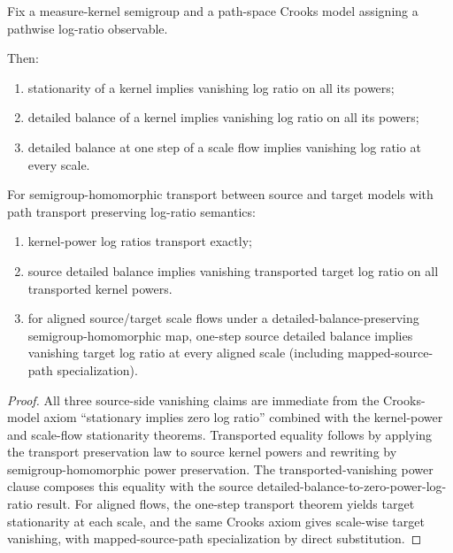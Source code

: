 \begin{theorem}\label{thm:path-space-crooks-kernel-power-transport}
Fix a measure-kernel semigroup and a path-space Crooks model assigning a pathwise log-ratio observable.

Then:
\begin{enumerate}
\item stationarity of a kernel implies vanishing log ratio on all its powers;
\item detailed balance of a kernel implies vanishing log ratio on all its powers;
\item detailed balance at one step of a scale flow implies vanishing log ratio at every scale.
\end{enumerate}

For semigroup-homomorphic transport between source and target models with path transport preserving log-ratio semantics:
\begin{enumerate}
\item kernel-power log ratios transport exactly;
\item source detailed balance implies vanishing transported target log ratio on all transported kernel powers.
\item for aligned source/target scale flows under a detailed-balance-preserving semigroup-homomorphic map, one-step source detailed balance implies vanishing target log ratio at every aligned scale (including mapped-source-path specialization).
\end{enumerate}
\end{theorem}

\begin{proof}
All three source-side vanishing claims are immediate from the Crooks-model axiom ``stationary implies zero log ratio'' combined with the kernel-power and scale-flow stationarity theorems. Transported equality follows by applying the transport preservation law to source kernel powers and rewriting by semigroup-homomorphic power preservation. The transported-vanishing power clause composes this equality with the source detailed-balance-to-zero-power-log-ratio result. For aligned flows, the one-step transport theorem yields target stationarity at each scale, and the same Crooks axiom gives scale-wise target vanishing, with mapped-source-path specialization by direct substitution.
\end{proof}

